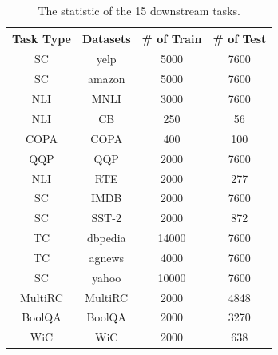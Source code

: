 \begin{table}[b]
\footnotesize
\centering
\caption{The statistic of the 15 downstream tasks.}
\label{tab:stats_15tasks}
\begin{tabular}{c|c|c|c}
\toprule
Task Type& Datasets & \# of Train & \# of Test\\
\midrule
SC & yelp & 5000 & 7600 \\
SC & amazon & 5000 & 7600 \\
NLI & MNLI & 3000 & 7600 \\
NLI & CB & 250 & 56 \\
COPA & COPA & 400 & 100 \\
QQP & QQP & 2000 & 7600 \\
NLI & RTE & 2000 & 277 \\
SC & IMDB & 2000 & 7600 \\
SC & SST-2 & 2000 & 872 \\
TC & dbpedia & 14000 & 7600 \\
TC & agnews & 4000 & 7600 \\
SC & yahoo & 10000 & 7600 \\
MultiRC & MultiRC & 2000 & 4848 \\
BoolQA & BoolQA & 2000 & 3270 \\
WiC & WiC & 2000 & 638 \\


\bottomrule
\end{tabular}

\end{table}